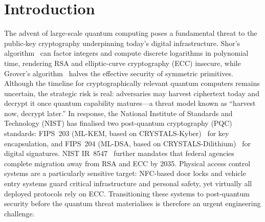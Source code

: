 \section{Introduction}

The advent of large-scale quantum computing poses a fundamental threat to the public-key cryptography underpinning today's digital infrastructure. Shor's algorithm~\cite{SIAM:Shor97} can factor integers and compute discrete logarithms in polynomial time, rendering RSA and elliptic-curve cryptography (ECC) insecure, while Grover's algorithm~\cite{STOC:Grover96} halves the effective security of symmetric primitives. Although the timeline for cryptographically relevant quantum computers remains uncertain, the strategic risk is real: adversaries may harvest ciphertext today and decrypt it once quantum capability matures---a threat model known as ``harvest now, decrypt later.'' In response, the National Institute of Standards and Technology (NIST) has finalised two post-quantum cryptography (PQC) standards: FIPS~203 (ML-KEM, based on CRYSTALS-Kyber)~\cite{NIST:FIPS203} for key encapsulation, and FIPS~204 (ML-DSA, based on CRYSTALS-Dilithium)~\cite{NIST:FIPS204} for digital signatures. NIST IR~8547~\cite{NIST:IR8547} further mandates that federal agencies complete migration away from RSA and ECC by 2035. Physical access control systems are a particularly sensitive target: NFC-based door locks and vehicle entry systems guard critical infrastructure and personal safety, yet virtually all deployed protocols rely on ECC. Transitioning these systems to post-quantum security before the quantum threat materialises is therefore an urgent engineering challenge.

